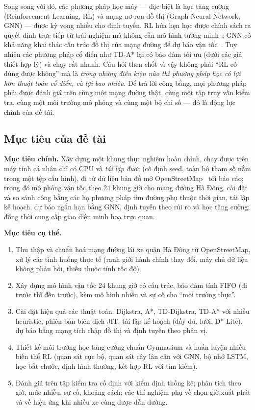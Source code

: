 Song song với đó, các phương pháp học máy --- đặc biệt là học tăng cường (Reinforcement Learning, RL) và mạng nơ-ron
đồ thị (Graph Neural Network, GNN) --- được kỳ vọng nhiều cho định tuyến. RL hứa hẹn học được chính sách ra quyết định
trực tiếp từ trải nghiệm mà không cần mô hình tường minh~\cite{sutton2018}; GNN có khả năng khai thác cấu trúc đồ thị
của mạng đường để dự báo vận tốc~\cite{li2018dcrnn,yu2018stgcn}. Tuy nhiên các phương pháp cổ điển như TD-A* lại có
bảo đảm tối ưu (dưới các giả thiết hợp lý) và chạy rất nhanh. Câu hỏi then chốt vì vậy không phải ``RL có dùng được
không'' mà là \emph{trong những điều kiện nào thì phương pháp học có lợi hơn thuật toán cổ điển, và lợi bao nhiêu}.
Để trả lời công bằng, mọi phương pháp phải được đánh giá trên cùng một mạng đường thật, cùng một tập truy vấn kiểm
tra, cùng một môi trường mô phỏng và cùng một bộ chỉ số --- đó là động lực chính của đề tài.

\subsection{Mục tiêu của đề tài}\label{sec:intro:goal}

\textbf{Mục tiêu chính.} Xây dựng một khung thực nghiệm hoàn chỉnh, chạy được trên máy tính cá nhân chỉ có CPU và
\emph{tái lập được} (cố định seed, toàn bộ tham số nằm trong một tệp cấu hình), đi từ dữ liệu bản đồ mở
OpenStreetMap~\cite{boeing2017} tới báo cáo; trong đó mô phỏng vận tốc theo 24 khung giờ cho mạng đường Hà Đông, cài
đặt và so sánh công bằng các họ phương pháp tìm đường phụ thuộc thời gian, tái lập kế hoạch, dự báo ngắn hạn bằng GNN,
định tuyến theo rủi ro và học tăng cường; đồng thời cung cấp giao diện minh hoạ trực quan.

\textbf{Mục tiêu cụ thể.}
\begin{enumerate}[label=(\arabic*)]
    \item Thu thập và chuẩn hoá mạng đường lái xe quận Hà Đông từ OpenStreetMap, xử lý các tình huống thực tế (ranh giới
    hành chính thay đổi, máy chủ dữ liệu không phản hồi, thiếu thuộc tính tốc độ).
    \item Xây dựng mô hình vận tốc 24 khung giờ có cấu trúc, bảo đảm tính FIFO (đi trước thì đến trước), kèm mô hình
    nhiễu và sự cố cho ``môi trường thực''.
    \item Cài đặt hiệu quả các thuật toán: Dijkstra, A*, TD-Dijkstra, TD-A* với nhiều heuristic, phiên bản biên dịch JIT,
    tái lập kế hoạch (đầy đủ, lười, D* Lite), dự báo bằng mạng tích chập đồ thị và định tuyến theo phân vị.
    \item Thiết kế môi trường học tăng cường chuẩn Gymnasium và huấn luyện nhiều biến thể RL (quan sát cục bộ, quan sát
    cây lân cận với GNN, bộ nhớ LSTM, học bắt chước, định hình thưởng, kết hợp RL với tìm kiếm).
    \item Đánh giá trên tập kiểm tra cố định với kiểm định thống kê; phân tích theo giờ, mức nhiễu, sự cố, khoảng cách;
    các thí nghiệm phụ về chọn giờ xuất phát và về hiệu ứng khi nhiều xe cùng được dẫn đường.
\end{enumerate}

